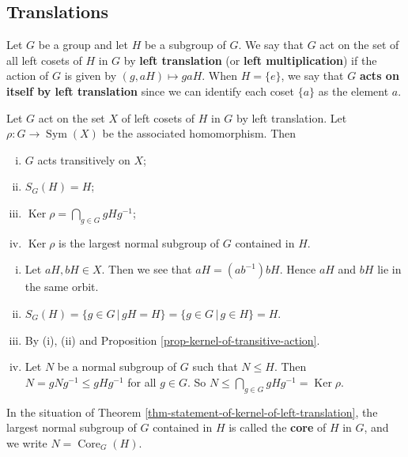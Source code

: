 \begin{remark}
\subsection{Translations}
\begin{definition}
	Let $G$ be a group and let $H$ be a subgroup of $G$. We say that $G$ act on the set of all left cosets of $H$ in $G$ by \textbf{left translation} (or \textbf{left multiplication}) if the action of $G$ is given by $(g,aH) \mapsto gaH$. When $H = \{e\}$, we say that $G$ \textbf{acts on itself by left translation} since we can identify each coset $\{a\}$ as the element $a$.
\end{definition}
\begin{theorem} \label{thm-statement-of-kernel-of-left-translation}
	Let $G$ act on the set $X$ of left cosets of $H$ in $G$ by left translation. Let $\rho:G\rightarrow \operatorname{Sym}(X)$ be the associated homomorphism. Then
	\begin{enumerate}[(i)]
		\item $G$ acts transitively on $X$;
		\item $S_G(H) = H$;
		\item $\operatorname{Ker} \rho  = \bigcap_{g\in G} gHg^{-1}$;
		\item $\operatorname{Ker} \rho$ is the largest normal subgroup of $G$ contained in $H$.
	\end{enumerate}
\end{theorem}
\begin{sketch}
	\begin{enumerate}[(i)]
		\item Let $aH,bH\in X$. Then we see that $aH= (ab^{-1})bH$. Hence $aH$ and $bH$ lie in the same orbit.
		\item $S_{G}(H) = \{g\in G\,|\, gH = H\} = \{g\in G\,|\, g\in H\} = H$.
		\item By (i), (ii) and Proposition \ref{prop-kernel-of-transitive-action}.
		\item Let $N$ be a normal subgroup of $G$ such that $N\leq H$. Then $N = gNg^{-1}\leq gHg^{-1}$ for all $g\in G$. So $N\leq \bigcap_{g\in G} gHg^{-1} = \operatorname{Ker}\rho$. \qedhere
	\end{enumerate}
\end{sketch}
In the situation of Theorem \ref{thm-statement-of-kernel-of-left-translation}, the largest normal subgroup of $G$ contained in $H$ is called the \textbf{core} of $H$ in $G$, and we write $N = \operatorname{Core}_G(H)$. 
\begin{corollary}\label{cor-action-on-itself-by-trans-is-faithful}

\end{corollary}
\end{remark}
